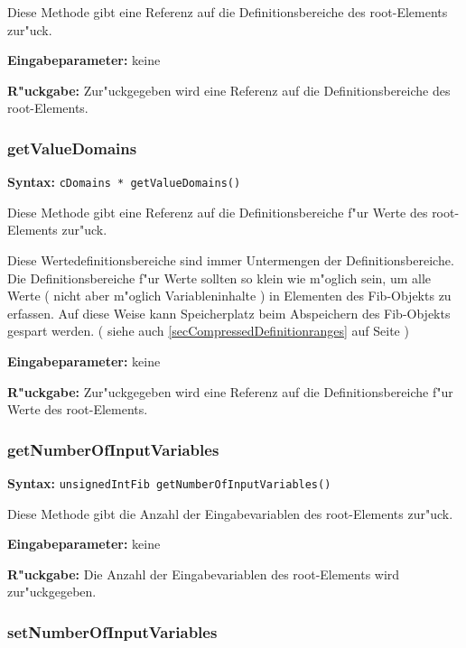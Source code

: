 \bigskip\noindent
Diese Methode gibt eine Referenz auf die Definitionsbereiche des root-Elements zur"uck.

\bigskip\noindent
\textbf{Eingabeparameter:} keine

\bigskip\noindent
\textbf{R"uckgabe:} Zur"uckgegeben wird eine Referenz auf die Definitionsbereiche des root-Elements.


\subsubsection{getValueDomains}

\textbf{Syntax:} \verb|cDomains * getValueDomains()|

\bigskip\noindent
Diese Methode gibt eine Referenz auf die Definitionsbereiche f"ur Werte des root-Elements zur"uck.

Diese Wertedefinitionsbereiche sind immer Untermengen der Definitionsbereiche. Die Definitionsbereiche f"ur Werte sollten so klein wie m"oglich sein, um alle Werte ( nicht aber m"oglich Variableninhalte ) in Elementen des Fib-Objekts zu erfassen. Auf diese Weise kann Speicherplatz beim Abspeichern des Fib-Objekts gespart werden. ( siehe auch \ref{secCompressedDefinitionranges} auf Seite \pageref{secCompressedDefinitionranges} )

\bigskip\noindent
\textbf{Eingabeparameter:} keine

\bigskip\noindent
\textbf{R"uckgabe:} Zur"uckgegeben wird eine Referenz auf die Definitionsbereiche f"ur Werte des root-Elements.


\subsubsection{getNumberOfInputVariables}

\textbf{Syntax:} \verb|unsignedIntFib getNumberOfInputVariables()|

\bigskip\noindent
Diese Methode gibt die Anzahl der Eingabevariablen des root-Elements zur"uck.

\bigskip\noindent
\textbf{Eingabeparameter:} keine

\bigskip\noindent
\textbf{R"uckgabe:} Die Anzahl der Eingabevariablen des root-Elements wird zur"uckgegeben.


\subsubsection{setNumberOfInputVariables}

